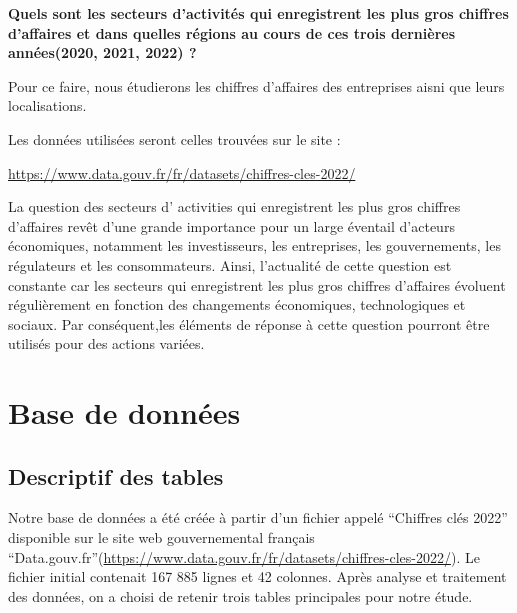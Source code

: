 \documentclass[mstat,12pt]{unswthesis}
\begin{document}
\bigskip

\centering

\textbf{Quels sont les secteurs d'activités qui enregistrent les plus
gros chiffres d'affaires et dans quelles régions au cours de ces trois
dernières années(2020, 2021, 2022) ? }

\justifying

\bigskip

Pour ce faire, nous étudierons les chiffres d'affaires des entreprises
aisni que leurs localisations.

Les données utilisées seront celles trouvées sur le site :

\url{https://www.data.gouv.fr/fr/datasets/chiffres-cles-2022/}

\medskip

La question des secteurs d' activities qui enregistrent les plus gros
chiffres d'affaires revêt d'une grande importance pour un large éventail
d'acteurs économiques, notamment les investisseurs, les entreprises, les
gouvernements, les régulateurs et les consommateurs. Ainsi, l'actualité
de cette question est constante car les secteurs qui enregistrent les
plus gros chiffres d'affaires évoluent régulièrement en fonction des
changements économiques, technologiques et sociaux. Par conséquent,les
éléments de réponse à cette question pourront être utilisés pour des
actions variées.

\medskip

\hypertarget{base-de-donnuxe9es}{%
\chapter{Base de données}\label{base-de-donnuxe9es}}

\hypertarget{descriptif-des-tables}{%
\section{Descriptif des tables}\label{descriptif-des-tables}}

Notre base de données a été créée à partir d'un fichier appelé
``Chiffres clés 2022'' disponible sur le site web gouvernemental
français
``Data.gouv.fr''(\url{https://www.data.gouv.fr/fr/datasets/chiffres-cles-2022/}).
Le fichier initial contenait 167 885 lignes et 42 colonnes. Après
analyse et traitement des données, on a choisi de retenir trois tables
principales pour notre étude.
\end{document}
